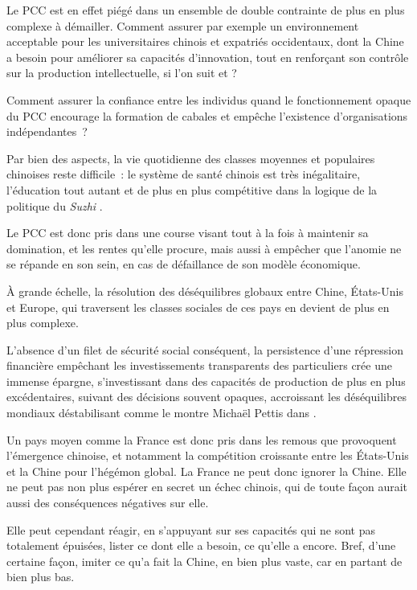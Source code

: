 \documentclass[a4paper]{article}
\begin{document}
 Le PCC est en effet piégé dans un ensemble de double contrainte de plus en plus complexe à démailler. Comment assurer par exemple un environnement acceptable pour les universitaires chinois et expatriés occidentaux, dont la Chine a besoin pour améliorer sa capacités d’innovation, tout en renforçant son contrôle sur la production intellectuelle, si l’on suit \cite{haour16_creat_china}
et \cite{simon09_chinas}?

Comment assurer la confiance entre les individus quand le fonctionnement opaque du PCC encourage la formation de cabales et empêche l’existence d’orga\-ni\-sa\-tions indépendantes~?

Par bien des aspects, la vie quotidienne des classes moyennes et populaires chinoises reste difficile~: le système de santé chinois est très inégalitaire, l’éducation tout autant et de plus en plus compétitive dans la logique de la politique du \textit{Suzhi} \cite{damien14_in}.

Le PCC est donc pris dans une course visant tout à la fois à maintenir sa domination, et les rentes qu’elle procure, mais aussi à empêcher que l’anomie ne se répande en son sein, en cas de défaillance de son modèle économique.

À grande échelle, la résolution des déséquilibres globaux entre Chine, États-Unis et Europe, qui traversent les classes sociales de ces pays en devient de plus en plus complexe.

L’absence d’un filet de sécurité social conséquent, la persistence d’une répression financière empêchant les investissements transparents des particuliers crée une immense épargne, s’investissant dans des capacités de production de plus en plus excédentaires, suivant des décisions souvent opaques, accroissant les déséquilibres mondiaux déstabilisant comme le montre Michaël Pettis dans \cite{klein20_trade}. 

Un pays moyen comme la France est donc pris dans les remous que provoquent l’émergence chinoise, et notamment la compétition croissante entre les États-Unis et la Chine pour l’hégémon global. La France ne peut donc ignorer la Chine. Elle ne peut pas non plus espérer en secret un échec chinois, qui de toute façon aurait aussi des conséquences négatives sur elle.

Elle peut cependant réagir, en s’appuyant sur ses capacités qui ne sont pas totalement épuisées, lister ce dont elle a besoin, ce qu’elle a encore. Bref, d’une certaine façon, imiter ce qu’a fait la Chine, en bien plus vaste, car en partant de bien plus bas.
\end{document}
